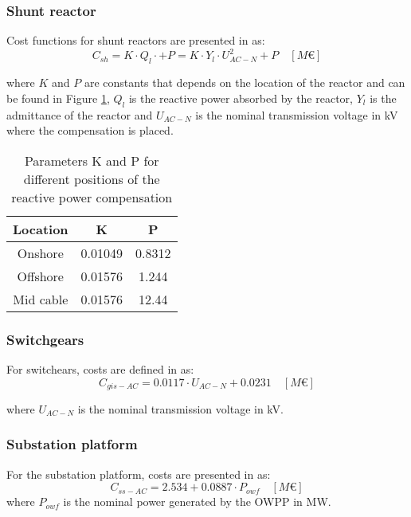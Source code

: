 \documentclass[a4paper,11pt, titlepage, twoside]{article}
\begin{document}
\subsubsection{Shunt reactor}
Cost functions for shunt reactors are presented in \cite{paperbase} as:
\begin{equation}\label{eq:shuntcost}
    C_{sh}= K \cdot Q_l \cdot + P = K \cdot Y_l\cdot U_{AC-N}^2 + P \quad \left[M\euro\right]
\end{equation}

where $K$ and $P$ are constants that depends on the location of the reactor and can be found in Figure \ref{tab:parametersshunt}, $Q_l$ is the reactive power absorbed by the reactor,
$Y_l$ is the admittance of the reactor and $U_{AC-N}$ is the nominal transmission voltage in kV where the compensation is placed.


\begin{table}[H]
    \centering
    \begin{tabular}{c|c|c}
    \hline
    \textbf{Location} & \textbf{K} & \textbf{P} \\
    \hline
    Onshore & 0.01049 & 0.8312  \\
    Offshore & 0.01576 & 1.244 \\
    Mid cable & 0.01576 & 12.44 \\
    \hline
    \end{tabular}
    \caption{Parameters K and P for different positions of the reactive power compensation \cite{paperbase}}
    \label{tab:parametersshunt}
    \end{table}
\subsubsection{Switchgears}

For switchears, costs are defined in \cite{switchcost} as:
\begin{equation}
    C_{gis-AC} = 0.0117 \cdot U_{AC-N} + 0.0231 \quad \left[M\euro\right]
\end{equation}

where $U_{AC-N}$ is the nominal transmission voltage in kV.
\subsubsection{Substation platform}
For the substation platform, costs are presented in \cite{chalmers} as:
\begin{equation}
    C_{ss-AC} = 2.534 + 0.0887 \cdot P_{owf} \quad \left[M\euro\right]
\end{equation}
where $P_{owf}$ is the nominal power generated by the OWPP in MW.
\end{document}
